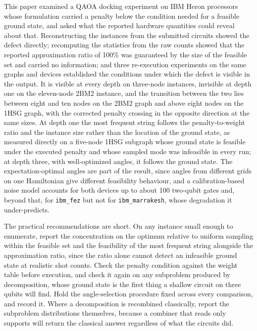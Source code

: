 \documentclass{iopjournal}
\begin{document}
This paper examined a QAOA docking experiment on IBM Heron processors whose formulation carried a penalty below the condition needed for a feasible ground state, and asked what the reported hardware quantities could reveal about that. Reconstructing the instances from the submitted circuits showed the defect directly; recomputing the statistics from the raw counts showed that the reported approximation ratio of 100\% was guaranteed by the size of the feasible set and carried no information; and three re-execution experiments on the same graphs and devices established the conditions under which the defect is visible in the output. It is visible at every depth on three-node instances, invisible at depth one on the eleven-node 2BM2 instance, and the transition between the two lies between eight and ten nodes on the 2BM2 graph and above eight nodes on the 1HSG graph, with the corrected penalty crossing in the opposite direction at the same sizes. At depth one the most frequent string follows the penalty-to-weight ratio and the instance size rather than the location of the ground state, as measured directly on a five-node 1HSG subgraph whose ground state is feasible under the executed penalty and whose sampled mode was infeasible in every run; at depth three, with well-optimized angles, it follows the ground state. The expectation-optimal angles are part of the result, since angles from different grids on one Hamiltonian give different feasibility behaviour, and a calibration-based noise model accounts for both devices up to about 100 two-qubit gates and, beyond that, for \texttt{ibm\_fez} but not for \texttt{ibm\_marrakesh}, whose degradation it under-predicts.

The practical recommendations are short. On any instance small enough to enumerate, report the concentration on the optimum relative to uniform sampling within the feasible set and the feasibility of the most frequent string alongside the approximation ratio, since the ratio alone cannot detect an infeasible ground state at realistic shot counts. Check the penalty condition against the weight table before execution, and check it again on any subproblem produced by decomposition, whose ground state is the first thing a shallow circuit on three qubits will find. Hold the angle-selection procedure fixed across every comparison, and record it. Where a decomposition is recombined classically, report the subproblem distributions themselves, because a combiner that reads only supports will return the classical answer regardless of what the circuits did.
\end{document}
